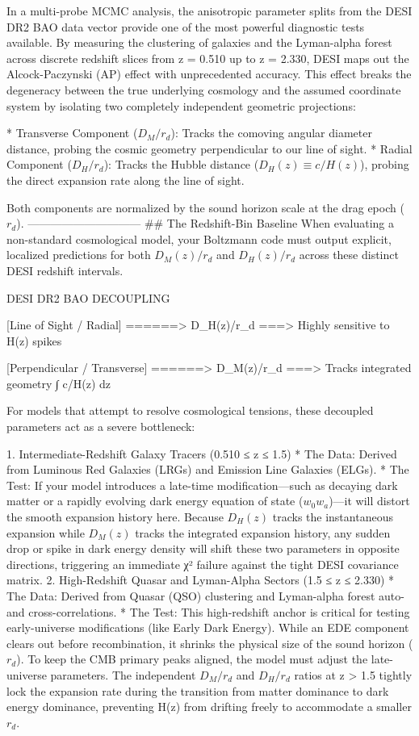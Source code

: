 In a multi-probe MCMC analysis, the anisotropic parameter splits from the DESI DR2 BAO data vector provide one of the most powerful diagnostic tests available.
By measuring the clustering of galaxies and the Lyman-alpha forest across discrete redshift slices from z = 0.510 up to z = 2.330, DESI maps out the Alcock-Paczynski (AP) effect with unprecedented accuracy. This effect breaks the degeneracy between the true underlying cosmology and the assumed coordinate system by isolating two completely independent geometric projections:

* Transverse Component ($D_M/r_d$): Tracks the comoving angular diameter distance, probing the cosmic geometry perpendicular to our line of sight.
* Radial Component ($D_H/r_d$): Tracks the Hubble distance ($D_H(z) \equiv c/H(z)$), probing the direct expansion rate along the line of sight.

Both components are normalized by the sound horizon scale at the drag epoch ($r_d$).
------------------------------
## The Redshift-Bin Baseline
When evaluating a non-standard cosmological model, your Boltzmann code must output explicit, localized predictions for both $D_M(z)/r_d$ and $D_H(z)/r_d$ across these distinct DESI redshift intervals.

                                    DESI DR2 BAO DECOUPLING
                         
  [Line of Sight / Radial]      ======> D_H(z)/r_d  ===> Highly sensitive to H(z) spikes
  
  [Perpendicular / Transverse]  ======> D_M(z)/r_d  ===> Tracks integrated geometry ∫ c/H(z) dz

For models that attempt to resolve cosmological tensions, these decoupled parameters act as a severe bottleneck:

   1. Intermediate-Redshift Galaxy Tracers (0.510 ≤ z ≤ 1.5)
   * The Data: Derived from Luminous Red Galaxies (LRGs) and Emission Line Galaxies (ELGs).
      * The Test: If your model introduces a late-time modification—such as decaying dark matter or a rapidly evolving dark energy equation of state ($w_0 w_a$)—it will distort the smooth expansion history here. Because $D_H(z)$ tracks the instantaneous expansion while $D_M(z)$ tracks the integrated expansion history, any sudden drop or spike in dark energy density will shift these two parameters in opposite directions, triggering an immediate χ² failure against the tight DESI covariance matrix.
   2. High-Redshift Quasar and Lyman-Alpha Sectors (1.5 ≤ z ≤ 2.330)
   * The Data: Derived from Quasar (QSO) clustering and Lyman-alpha forest auto- and cross-correlations.
      * The Test: This high-redshift anchor is critical for testing early-universe modifications (like Early Dark Energy). While an EDE component clears out before recombination, it shrinks the physical size of the sound horizon ($r_d$). To keep the CMB primary peaks aligned, the model must adjust the late-universe parameters. The independent $D_M/r_d$ and $D_H/r_d$ ratios at z > 1.5 tightly lock the expansion rate during the transition from matter dominance to dark energy dominance, preventing H(z) from drifting freely to accommodate a smaller $r_d$.
   
